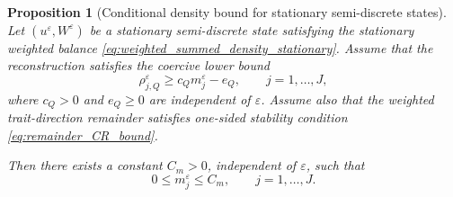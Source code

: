 \documentclass[11pt, dina4, amsfont12]{article}
\newtheorem{proposition}{Proposition}[section]
\begin{document}
\begin{proposition}[Conditional density bound for stationary semi-discrete states]
\label{prop:uniform_bound_stationary_mass}
Let \((u^\varepsilon,W^\varepsilon)\) be a stationary semi-discrete state
satisfying the stationary weighted balance \eqref{eq:weighted_summed_density_stationary}.
Assume that the reconstruction satisfies the coercive lower bound
\begin{equation}\label{eq:quadrature_coercivity_lower}
    \rho_{j,Q}^\varepsilon
    \ge
    c_Qm_j^\varepsilon-e_Q,
    \qquad j=1,\ldots,J,
\end{equation}
where \(c_Q>0\) and \(e_Q\ge0\) are independent of \(\varepsilon\). Assume
also that the weighted trait-direction remainder satisfies one-sided stability condition \eqref{eq:remainder_CR_bound}.

Then there exists a constant \(C_m>0\), independent of \(\varepsilon\), such
that
\[
    0\le m_j^\varepsilon\le C_m,
    \qquad j=1,\ldots,J .
\]
\end{proposition}
\end{document}
